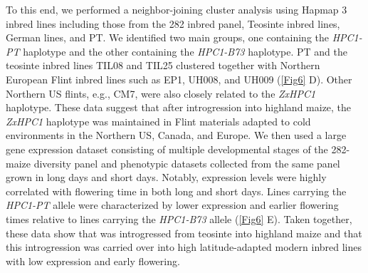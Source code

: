 To this end, we performed a neighbor-joining cluster analysis using Hapmap 3 \citep{bukowski2017-ng} inbred lines including those from the 282 inbred panel, Teosinte inbred lines, German lines, and PT. 
We identified two main groups, one containing the \textit{HPC1-PT} haplotype and the other containing the \textit{HPC1-B73} haplotype.
PT and the teosinte \mex inbred lines TIL08 and TIL25 clustered together with Northern European Flint inbred lines such as EP1, UH008, and UH009 (\autoref{Fig6} D). 
Other Northern US flints, e.g., CM7, were also closely related to the \mex \textit{ZxHPC1} haplotype. 
These data suggest that after introgression into highland maize, the \textit{ZxHPC1} haplotype was maintained in Flint materials adapted to cold environments in the Northern US, Canada, and Europe. 
We then used a large gene expression dataset consisting of multiple developmental stages of the 282-maize diversity panel \citep{kremling2018-gn} and phenotypic datasets collected from the same panel grown in long days and short days.
Notably, \hpc expression levels were highly correlated with flowering time in both long and short days. 
Lines carrying the \textit{HPC1-PT} allele were characterized by lower \hpc expression and earlier flowering times relative to lines carrying the \textit{HPC1-B73} allele (\autoref{Fig6} E).
Taken together, these data show that \hpc was introgressed from teosinte \mex into highland maize and that this introgression was carried over into high latitude-adapted modern inbred lines with low \hpc expression and early flowering.
